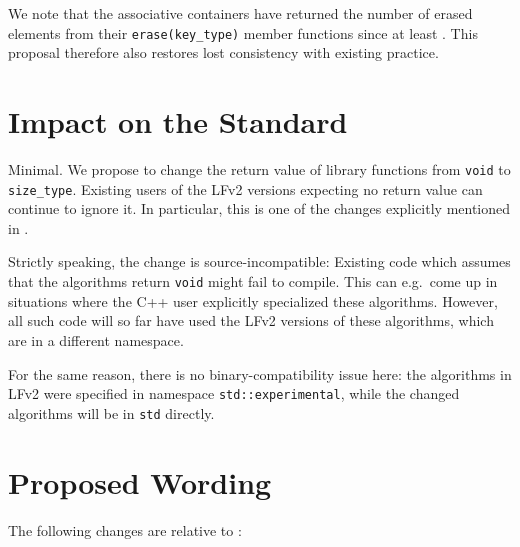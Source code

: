 \documentclass[11pt]{article}
\begin{document}
We note that the associative containers have returned the number of
erased elements from their \texttt{erase(key\_type)} member functions
since at least \cite{STL}. This proposal therefore also restores
lost consistency with existing practice.

\section{Impact on the Standard}

Minimal. We propose to change the return value of library functions
from \texttt{void} to \texttt{size\_type}. Existing users of the LFv2
versions expecting no return value can continue to ignore it. In
particular, this is one of the changes explicitly mentioned in
\cite{P0921R2}.

Strictly speaking, the change is source-incompatible: Existing code
which assumes that the algorithms return \texttt{void} might fail to
compile. This can e.g.\ come up in situations where the C++ user
explicitly specialized these algorithms. However, all such code will
so far have used the LFv2 versions of these algorithms, which are in a
different namespace.

For the same reason, there is no binary-compatibility issue here: the
algorithms in LFv2 were specified in namespace
\texttt{std::experimental}, while the changed algorithms will be in
\texttt{std} directly.

\section{Proposed Wording}

The following changes are relative to \cite{N4810}:
\end{document}
